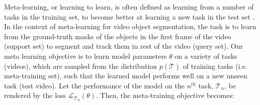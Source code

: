 \documentclass[10pt,twocolumn,letterpaper]{article}
\begin{document}
Meta-learning, or learning to learn, is often defined as learning from a number of tasks in the training set, to become better at learning a new task in the test set \cite{MAML, NIPS2017_6996}.
In the context of meta-learning for video object segmentation, the task is to learn from the ground-truth masks of the objects in the first frame of the video (support set) to segment and track them in rest of the video (query set).
Our meta learning objective is to learn model parameters $\theta$ on a variety of tasks (videos), which are sampled from the distribution $p(\mathcal{T})$ of training tasks (i.e. meta-training set), such that the learned model performs well on a new unseen task (test video).
Let the performance of the model on the $n^{th}$ task, $\mathcal{T}_n$, be rendered by the loss $\mathcal{L}_{\mathcal{T}_n}(\theta)$. 
Then, the meta-training objective becomes:
\end{document}
